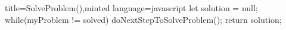 \documentclass[varwidth]{standalone}
\begin{document}
\begin{codeBlock}[autogobble]{title=SolveProblem(),minted language=javascript}
let solution = null;
while(myProblem != solved){
    doNextStepToSolveProblem();
}
return solution;
\end{codeBlock}
\end{document}
